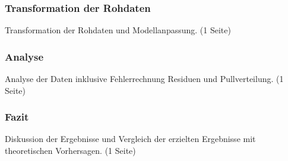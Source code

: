 \documentclass[12pt,a4paper]{article}
\begin{document}
\subsubsection{Transformation der Rohdaten}
Transformation der Rohdaten und Modellanpassung. (1 Seite)
\subsubsection{Analyse}
Analyse der Daten inklusive Fehlerrechnung Residuen und Pullverteilung. (1 Seite)
\subsubsection{Fazit}
Diskussion der Ergebnisse und Vergleich der erzielten Ergebnisse mit theoretischen Vorhersagen.
(1 Seite)
\end{document}
